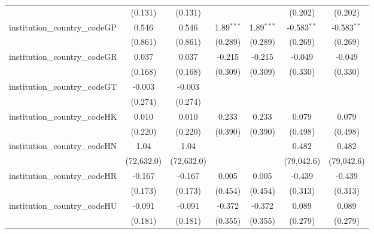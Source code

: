 \begin{tabular}{lcccccc}
                                         & (0.131)        & (0.131)        &                &                & (0.202)        & (0.202)\\   
   institution\_country\_codeGP          & 0.546          & 0.546          & 1.89$^{***}$   & 1.89$^{***}$   & -0.583$^{**}$  & -0.583$^{**}$\\   
                                         & (0.861)        & (0.861)        & (0.289)        & (0.289)        & (0.269)        & (0.269)\\   
   institution\_country\_codeGR          & 0.037          & 0.037          & -0.215         & -0.215         & -0.049         & -0.049\\   
                                         & (0.168)        & (0.168)        & (0.309)        & (0.309)        & (0.330)        & (0.330)\\   
   institution\_country\_codeGT          & -0.003         & -0.003         &                &                &                &   \\   
                                         & (0.274)        & (0.274)        &                &                &                &   \\   
   institution\_country\_codeHK          & 0.010          & 0.010          & 0.233          & 0.233          & 0.079          & 0.079\\   
                                         & (0.220)        & (0.220)        & (0.390)        & (0.390)        & (0.498)        & (0.498)\\   
   institution\_country\_codeHN          & 1.04           & 1.04           &                &                & 0.482          & 0.482\\   
                                         & (72,632.0)     & (72,632.0)     &                &                & (79,042.6)     & (79,042.6)\\   
   institution\_country\_codeHR          & -0.167         & -0.167         & 0.005          & 0.005          & -0.439         & -0.439\\   
                                         & (0.173)        & (0.173)        & (0.454)        & (0.454)        & (0.313)        & (0.313)\\   
   institution\_country\_codeHU          & -0.091         & -0.091         & -0.372         & -0.372         & 0.089          & 0.089\\   
                                         & (0.181)        & (0.181)        & (0.355)        & (0.355)        & (0.279)        & (0.279)\\   

\end{tabular}
